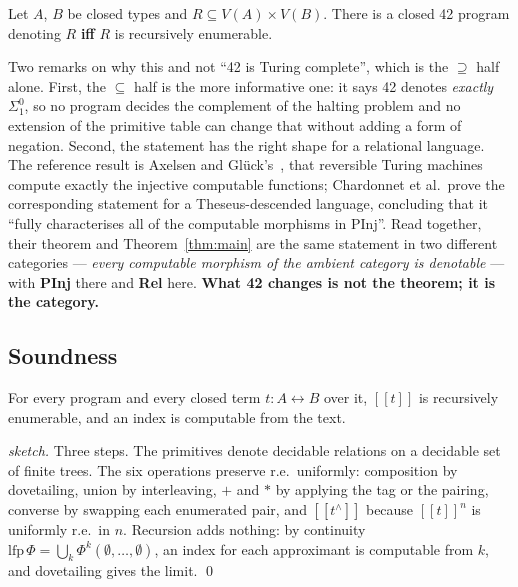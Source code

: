 \documentclass[runningheads,envcountsame]{llncs}
\newcommand{\den}[1]{\ensuremath{[\![#1]\!]}}
\newcommand{\iso}{\leftrightarrow}
\newcommand{\Rel}{\textbf{Rel}}
\newcommand{\PInj}{\textbf{PInj}}
\newcommand{\clo}{\ensuremath{^{\wedge}}}
\begin{document}
\begin{theorem}\label{thm:main}
Let $A$, $B$ be closed types and $R \subseteq V(A) \times V(B)$. There is a closed
42 program denoting $R$ \textbf{iff} $R$ is recursively enumerable.
\end{theorem}

Two remarks on why this and not ``42 is Turing complete'', which is the
$\supseteq$ half alone. First, the $\subseteq$ half is the more informative one: it
says 42 denotes \emph{exactly} $\Sigma^0_1$, so no program decides the complement
of the halting problem and no extension of the primitive table can change that
without adding a form of negation. Second, the statement has the right shape for a
relational language. The reference result is Axelsen and Gl\"uck's~\cite{axelsen},
that reversible Turing machines compute exactly the injective computable functions;
Chardonnet et al.\ prove the corresponding statement for a Theseus-descended
language, concluding that it ``fully characterises all of the computable morphisms
in PInj''. Read together, their theorem and Theorem~\ref{thm:main} are the same
statement in two different categories --- \emph{every computable morphism of the
ambient category is denotable} --- with \PInj{} there and \Rel{} here.
\textbf{What 42 changes is not the theorem; it is the category.}

\subsection{Soundness}

\begin{proposition}\label{prop:re}
For every program and every closed term $t : A \iso B$ over it, $\den{t}$ is
recursively enumerable, and an index is computable from the text.
\end{proposition}

\begin{proof}[sketch]
Three steps. The primitives denote decidable relations on a decidable set of finite
trees. The six operations preserve r.e.\ uniformly: composition by dovetailing,
union by interleaving, $+$ and $*$ by applying the tag or the pairing, converse by
swapping each enumerated pair, and $\den{t\clo}$ because $\den{t}^n$ is
uniformly r.e.\ in $n$. Recursion adds nothing: by continuity
$\mathrm{lfp}\,\Phi = \bigcup_k \Phi^k(\emptyset,\dots,\emptyset)$, an index for each
approximant is computable from $k$, and dovetailing gives the limit. \qed
\end{proof}
\end{document}
